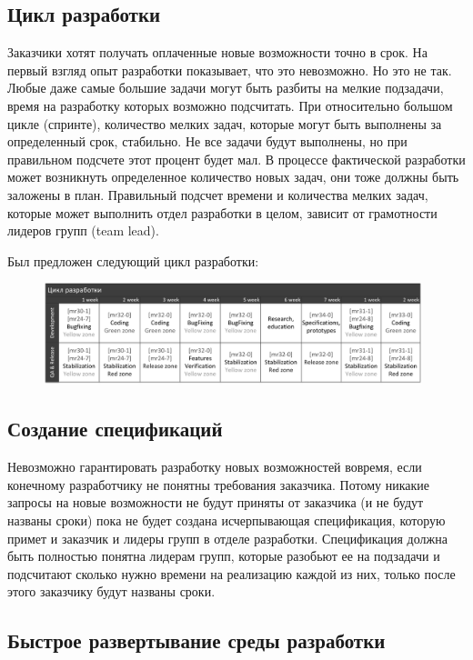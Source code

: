 \documentclass[10pt, a5paper]{article}
\begin{document}
\subsection*{Цикл разработки}

Заказчики хотят получать оплаченные новые возможности точно в срок.
На первый взгляд опыт разработки показывает, что это невозможно. Но это не так. Любые даже самые большие задачи могут быть разбиты на мелкие подзадачи, время на разработку которых возможно подсчитать. При относительно большом цикле (спринте), количество мелких задач, которые могут быть выполнены за определенный срок, стабильно. Не все задачи будут выполнены, но при правильном подсчете этот процент будет мал. В процессе фактической разработки может возникнуть определенное количество новых задач, они тоже должны быть заложены в план. Правильный подсчет времени и количества мелких задач, которые может выполнить отдел разработки в целом,  зависит от грамотности лидеров групп (team lead).

Был предложен следующий цикл разработки:

\begin{figure}[h!]
  \centering
  \includegraphics[width=11cm]{05_circle_v3.png}
\end{figure}

\subsection*{Создание спецификаций}

Невозможно гарантировать разработку новых возможностей вовремя, если конечному разработчику не понятны требования заказчика. Потому никакие запросы на новые возможности не будут приняты от заказчика (и не будут названы сроки) пока не будет создана исчерпывающая спецификация, которую примет и заказчик и лидеры групп в отделе разработки. Спецификация должна быть полностью понятна лидерам групп, которые разобьют ее на подзадачи и подсчитают сколько нужно времени на реализацию каждой из них, только после этого заказчику будут названы сроки.

\subsection*{Быстрое развертывание среды разработки}
\end{document}
